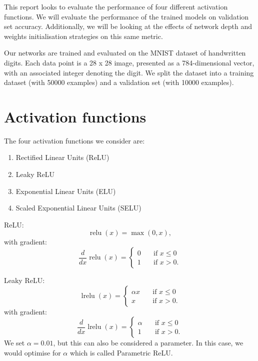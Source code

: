 \documentclass{article}
\DeclareMathOperator{\relu}{relu}
\DeclareMathOperator{\lrelu}{lrelu}
\begin{document}
This report looks to evaluate the performance of four different activation functions. We will evaluate the performance of the trained models on validation set accuracy. Additionally, we will be looking at the effects of network depth and weights initialisation strategies on this same metric.

Our networks are trained and evaluated on the MNIST dataset of handwritten digits. Each data point is a 28 x 28 image, presented as a 784-dimensional vector, with an associated integer denoting the digit. We split the dataset into a training dataset (with 50000 examples) and a validation set (with 10000 examples). 
\section{Activation functions}
\label{sec:actfn}
The four activation functions we consider are:
\begin{enumerate}
\item Rectified Linear Units (ReLU)
\item Leaky ReLU
\item Exponential Linear Units (ELU)
\item Scaled Exponential Linear Units (SELU)
\end{enumerate}
ReLU: 
\begin{equation}
  \relu(x) = \max(0, x) ,
\end{equation} 
with gradient:
\begin{equation}
  \frac{d}{dx} \relu(x) =
     \begin{cases} 
      0      & \quad \text{if } x \leq  0 \\
      1       & \quad \text{if } x > 0 .
    \end{cases} 
\end{equation}

Leaky ReLU: 
\begin{equation}
  \lrelu(x) =
     \begin{cases} 
      \alpha x      & \quad \text{if } x \leq  0 \\
      x       & \quad \text{if } x > 0 .
    \end{cases} 
\end{equation} 
with gradient:
\begin{equation}
  \frac{d}{dx} \lrelu(x) =
     \begin{cases} 
      \alpha      & \quad \text{if } x \leq  0 \\
      1       & \quad \text{if } x > 0 .
    \end{cases} 
\end{equation}
We set $\alpha = 0.01$, but this can also be considered a parameter. In this case, we would optimise for $\alpha$ which is called Parametric ReLU. 
\end{document}
